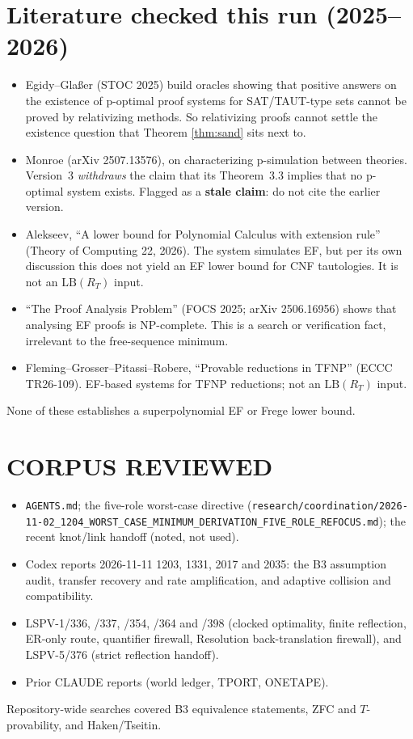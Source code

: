 \documentclass[11pt]{article}
\theoremstyle{definition}
\theoremstyle{remark}
\begin{document}
\section*{Literature checked this run (2025--2026)}
\begin{itemize}
\item Egidy--Glaßer (STOC 2025) build oracles showing that positive answers on the existence of
p-optimal proof systems for SAT/TAUT-type sets cannot be proved by relativizing methods. So
relativizing proofs cannot settle the existence question that Theorem \ref{thm:sand} sits next to.
\item Monroe (arXiv 2507.13576), on characterizing p-simulation between theories. Version~3
\emph{withdraws} the claim that its Theorem~3.3 implies that no p-optimal system exists. Flagged
as a \textbf{stale claim}: do not cite the earlier version.
\item Alekseev, ``A lower bound for Polynomial Calculus with extension rule'' (Theory of Computing
22, 2026). The system simulates EF, but per its own discussion this does not yield an EF lower bound
for CNF tautologies. It is not an $\mathrm{LB}(R_T)$ input.
\item ``The Proof Analysis Problem'' (FOCS 2025; arXiv 2506.16956) shows that analysing EF proofs is
NP-complete. This is a search or verification fact, irrelevant to the free-sequence minimum.
\item Fleming--Grosser--Pitassi--Robere, ``Provable reductions in TFNP'' (ECCC TR26-109).
EF-based systems for TFNP reductions; not an $\mathrm{LB}(R_T)$ input.
\end{itemize}
None of these establishes a superpolynomial EF or Frege lower bound.

\section*{CORPUS REVIEWED}
\begin{itemize}
\item \texttt{AGENTS.md}; the five-role worst-case directive
(\texttt{research/coordination/2026-11-02\_1204\_WORST\_CASE\_MINIMUM\_DERIVATION\_FIVE\_ROLE\_REFOCUS.md});
the recent knot/link handoff (noted, not used).
\item Codex reports 2026-11-11 1203, 1331, 2017 and 2035: the B3 assumption audit, transfer
recovery and rate amplification, and adaptive collision and compatibility.
\item LSPV-1/336, /337, /354, /364 and /398 (clocked optimality, finite reflection, ER-only
route, quantifier firewall, Resolution back-translation firewall), and LSPV-5/376 (strict
reflection handoff).
\item Prior CLAUDE reports (world ledger, TPORT, ONETAPE).
\end{itemize}
Repository-wide searches covered B3 equivalence statements, ZFC and $T$-provability, and
Haken/Tseitin.
\end{document}
